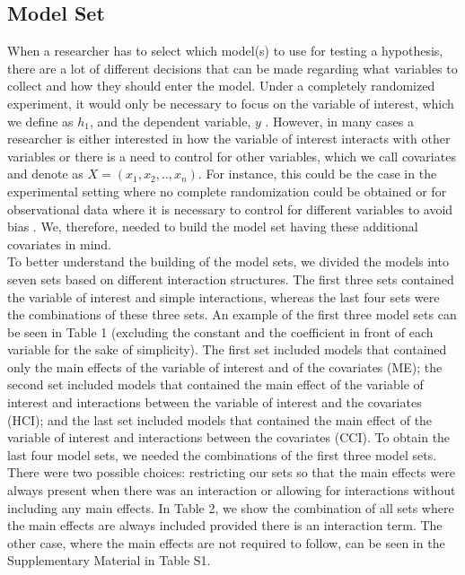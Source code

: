 \subsection{Model Set}
When a researcher has to select which model(s) to use for testing a hypothesis, there are a lot of different decisions that can be made regarding what variables to collect and how they should enter the model. Under a completely randomized experiment, it would only be necessary to focus on the variable of interest, which we define as $h_1$, and the dependent variable, $y$ \citep{angrist2008mostly}. However, in many cases a researcher is either interested in how the variable of interest interacts with other variables or there is a need to control for other variables, which we call covariates and denote as $X=(x_1,x_2,..,x_n)$. For instance, this could be the case in the experimental setting where no complete randomization could be obtained or for observational data where it is necessary to control for different variables to avoid bias \citep{angrist2008mostly}. We, therefore, needed to build the model set having these additional covariates in mind. \\ 
To better understand the building of the model sets, we divided the models into seven sets based on different interaction structures. The first three sets contained the variable of interest and simple interactions, whereas the last four sets were the combinations of these three sets. An example of the first three model sets can be seen in Table 1 (excluding the constant and the coefficient in front of each variable for the sake of simplicity). The first set included models that contained only the main effects of the variable of interest and of the covariates (ME); the second set included models that contained the main effect of the variable of interest and interactions between the variable of interest and the covariates (HCI); and the last set included models that contained the main effect of the variable of interest and interactions between the covariates (CCI).
To obtain the last four model sets, we needed the combinations of the first three model sets. There were two possible choices: restricting our sets so that the main effects were always present when there was an interaction or allowing for interactions without including any main effects. In Table 2, we show the combination of all sets where the main effects are always included provided there is an interaction term. The other case, where the main effects are not required to follow, can be seen in the Supplementary Material in Table S1. \\

